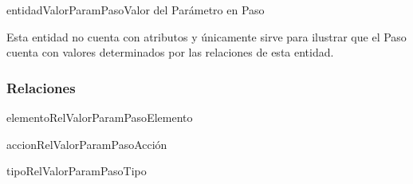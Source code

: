 \begin{BusinessEntity}{entidadValorParamPaso}{Valor del Parámetro en Paso}
		
	\item Esta entidad no cuenta con atributos y únicamente sirve para ilustrar que el Paso cuenta con valores determinados por las relaciones de esta entidad.
	
\end{BusinessEntity}

\subsubsection{Relaciones}
\begin{BusinessFact}{elementoRelValorParamPaso}{Elemento}
\end{BusinessFact}

\begin{BusinessFact}{accionRelValorParamPaso}{Acción}
\end{BusinessFact}

\begin{BusinessFact}{tipoRelValorParamPaso}{Tipo}
\end{BusinessFact}